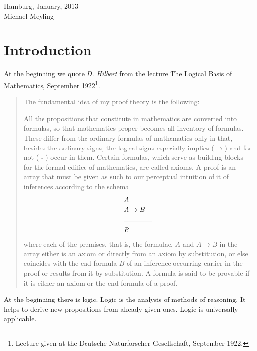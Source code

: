 \documentclass[a4paper,german,10pt,twoside]{book}
\theoremstyle{definition}
\theoremstyle{remark}
\begin{document}
\par
\vspace*{1cm} Hamburg, January, 2013 \\
\hspace*{\fill} Michael Meyling


\chapter*{Introduction} \label{chapter3} \hypertarget{chapter3}{}

At the beginning we quote \emph{D. Hilbert} from the lecture {\glqq The Logical Basis of Mathematics\grqq}, September 
1922\footnote{Lecture given at the Deutsche Naturforscher-Gesellschaft, September 1922.}.

\par
\begin{quote} {
\glqq The fundamental idea of my proof theory is the following:

\par
All the propositions that constitute in mathematics are converted into formulas, so that mathematics proper becomes all inventory of formulas. These differ from the ordinary formulas of mathematics only in that, besides the ordinary signs, 
the logical signs especially {\glqq implies\grqq} ($\rightarrow$) and for {\glqq not\grqq} ($\bar{\quad}$) occur in them. 
Certain formulas, which serve as building blocks for the formal edifice of mathematics, are called axioms. A proof is an array that must be given as such to our perceptual intuition of it of inferences according to the schema\\
\begin{eqnarray*}
& A & \\
& A \rightarrow B& \\
\cline{2-3}
 & B &
\end{eqnarray*}
where each of the premises, that is, the formulae, $A$ and $A \rightarrow B$ in the array either is an axiom or directly from an axiom by substitution, or else coincides with the end formula $B$ of an inference occurring earlier in the proof or results from it by substitution. A formula is said to be provable if it is either an axiom or the end formula of a proof.\grqq}
\end{quote}

\par
At the beginning there is logic. Logic is the analysis of methods of reasoning. It helps to derive new propositions from already given ones. Logic is universally applicable.
\end{document}
